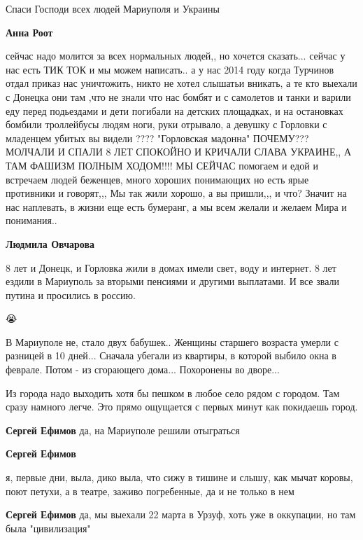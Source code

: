 
Спаси Господи всех людей Мариуполя и Украины

\begin{itemize} %
\textbf{Анна Роот} 

сейчас надо молится за всех нормальных людей,, но хочется сказать... сейчас у нас
есть ТИК ТОК и мы можем написать.. а у нас 2014 году когда Турчинов отдал
приказ нас уничтожить, никто не хотел слышатьи вникать, а те кто выехали с
Донецка они там ,что не знали что нас бомбят и с самолетов и танки и варили еду
перед подьездами и дети погибали на детских площадках, и на остановках бомбили
троллейбусы людям ноги, руки отрывало, а девушку с Горловки с младенцем убитых
вы видели ???? "Горловская мадонна" ПОЧЕМУ??? МОЛЧАЛИ И СПАЛИ 8 ЛЕТ СПОКОЙНО И
КРИЧАЛИ СЛАВА УКРАИНЕ,, А ТАМ ФАШИЗМ ПОЛНЫМ ХОДОМ!!!! МЫ СЕЙЧАС помогаем и едой и
встречаем людей беженцев, много хороших понимающих но есть ярые противники и
говорят,,, Мы так жили хорошо, а вы пришли,,, и что? Значит на нас наплевать, в
жизни еще есть бумеранг, а мы всем желали и желаем Мира и понимания..

\textbf{Людмила Овчарова} 

8 лет и Донецк, и Горловка жили в домах имели свет, воду и интернет. 8 лет
ездили в Мариуполь за вторыми пенсиями и другими выплатами. И все звали путина
и просились в россию.

\end{itemize} %


😭


В Мариуполе не, стало двух бабушек.. Женщины старшего возраста умерли с
разницей в 10 дней... Сначала убегали из квартиры, в которой выбило окна в
феврале. Потом - из сгорающего дома... Похоронены во дворе...


Из города надо выходить хотя бы пешком в любое село рядом с городом. Там сразу
намного легче. Это прямо ощущается с первых минут как покидаешь город.

\begin{itemize} %
\textbf{Сергей Ефимов} да, на Мариуполе решили отыграться

\textbf{Сергей Ефимов} 

я, первые дни, выла, дико выла, что сижу в тишине и слышу, как мычат коровы,
поют петухи, а в театре, заживо погребенные, да и не только в нем

\textbf{Сергей Ефимов} да, мы выехали 22 марта в Урзуф, хоть уже в оккупации, но там была "цивилизация"
\end{itemize} %

